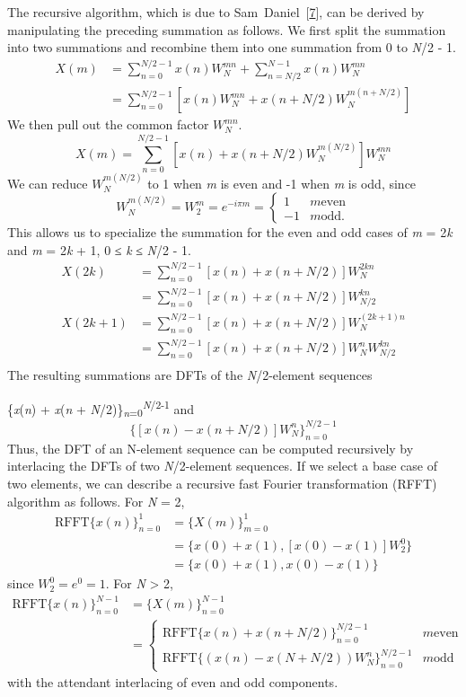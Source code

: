 The recursive algorithm, which is due to Sam Daniel [\hyperref[bibliography_g225]{7}],
can be derived by manipulating the preceding summation as follows.
We first split the summation into two summations and
recombine them into one summation from 0 to \textit{N}/2 - 1.
\begin{align*}
X(m) &= \sum^{N/2-1}_{n=0}x(n)W_N^{mn}+\sum^{N-1}_{n=N/2}x(n)W_N^{mn} \\
     &= \sum^{N/2-1}_{n=0}[x(n)W_N^{mn}+x(n+N/2)W_N^{m(n+N/2)}]
\end{align*}
We then pull out the common factor \(W_N^{mn}\).
\[X(m)=\sum^{N/2-1}_{n=0}[x(n)+x(n+N/2)W_N^{m(N/2)}]W_N^{mn}\]
We can reduce \(W_N^{m(N/2)}\) to 1 when \textit{m} is even and -1 when \textit{m} is
odd, since
\[
W_N^{m(N/2)}=W_2^m=e^{-i\pi{}m}= \begin{cases}
    1 & m \text{even} \\
   -1 & m \text{odd.}
\end{cases}
\]
This allows us to specialize the summation for the even and odd cases of
\textit{m} = 2\textit{k} and \textit{m} = 2\textit{k} + 1, 0 ≤ \textit{k} ≤ \textit{N}/2 - 1.
\begin{align*}
X(2k) &= \sum^{N/2-1}_{n=0}[x(n)+x(n+N/2)]W_N^{2kn} \\
      &= \sum^{N/2-1}_{n=0}[x(n)+x(n+N/2)]W_{N/2}^{kn} \\
X(2k+1) &= \sum^{N/2-1}_{n=0}[x(n)+x(n+N/2)]W_N^{(2k+1)n} \\
      &= \sum^{N/2-1}_{n=0}[x(n)+x(n+N/2)]W_N^n W_{N/2}^{kn} \\
\end{align*}
The resulting summations are DFTs of the
\textit{N}/2-element sequences

\{\textit{x}(\textit{n}) + \textit{x}(\textit{n} + \textit{N}/2)\}\textsubscript{\textit{n}=0}\textsuperscript{\textit{N}/2-1}
and
\[\{[x(n)-x(n+N/2)]W_N^n\}_{n=0}^{N/2-1}\]
Thus, the DFT of an N-element sequence
can be computed recursively by interlacing the
DFTs of two \textit{N}/2-element sequences.
If we select a base case of two elements, we can describe a recursive
fast Fourier transformation (RFFT) algorithm as follows.
For \textit{N} = 2,
\begin{align*}
\mathrm{RFFT}\{x(n)\}_{n=0}^1 &= \{ X(m) \}_{m=0}^1 \\
                              &= \{ x(0) + x(1), [x(0)-x(1)]W_2^0 \} \\
                              &= \{ x(0) + x(1), x(0) - x(1) \}
\end{align*}
since \(W_2^0=e^0=1\).
For \textit{N} \textgreater{} 2,
\begin{align*}
\mathrm{RFFT}\{x(n)\}_{n=0}^{N-1} &= \{ X(m) \}_{n=0}^{N-1} \\
                                  &= \begin{cases}
    \mathrm{RFFT}\{x(n)+x(n+N/2)\}_{n=0}^{N/2-1} & m \text{even} \\
    \mathrm{RFFT}\{(x(n)-x(N+N/2))W_N^n\}_{n=0}^{N/2-1} & m \text{odd}
\end{cases}
\end{align*}
with the attendant interlacing of even and odd components.

